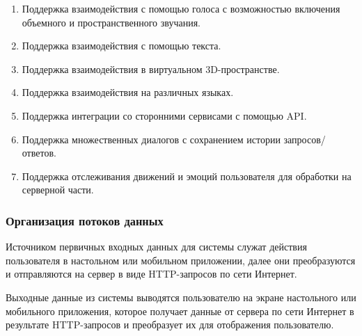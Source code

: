 \documentclass[a4paper,14pt]{extarticle}
\begin{document}
\begin{spacing}{1.5}
\begin{enumerate}[label*=\arabic*.]
\begin{enumerate}[label*=\arabic*.]
            \item Поддержка взаимодействия с помощью голоса {\color{RoyalBlue} с возможностью включения объемного и пространственного звучания.} 
            \item {\color{BrickRed}Поддержка взаимодействия с помощью текста.}
            \item {\color{RoyalBlue}Поддержка взаимодействия в виртуальном 3D-пространстве.}
            \item Поддержка взаимодействия на различных языках.
            \item Поддержка интеграции со сторонними сервисами с помощью API.
            \item Поддержка множественных диалогов с сохранением истории запросов/ответов.
            \item {\color{RoyalBlue}Поддержка отслеживания движений и эмоций пользователя для обработки  на серверной части.}
        \end{enumerate}
\end{enumerate}

\subsubsection{Организация потоков данных}

\hspace{\parindent} Источником первичных входных данных для системы служат действия пользователя в настольном или мобильном приложении, далее они преобразуются и отправляются на сервер в виде HTTP-запросов по сети Интернет.

Выходные данные из системы выводятся пользователю на экране настольного или мобильного приложения, которое получает данные от сервера по сети Интернет в результате HTTP-запросов и преобразует их для отображения пользователю.



\end{spacing}
\end{document}

